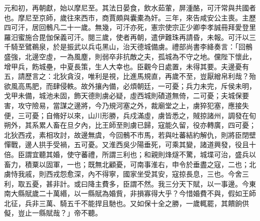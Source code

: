 \begin{pinyinscope}
 元和初，再朝獻，始以摩尼至。其法日晏食，飲水茹葷，屏湩酪，可汗常與共國者也。摩尼至京師，歲往來西市，商賈頗與囊橐為奸。三年，來告咸安公主喪。主歷四可汗，居回鶻凡二十一歲。無幾，可汗亦死，憲宗使宗正少卿李孝誠冊拜愛登里羅汨蜜施合毘伽保義可汗。閱三歲，使者再朝，遣伊難珠再請昏，未報。可汗以三千騎至鷿鵜泉，於是振武以兵屯黑山，治天德城備虜。禮部尚書李絳奏言：「回鶻盛強，北邊空虛，一為風塵，則弱卒非抗敵之夫，孤城為不守之地。儻陛下懷此，增甲兵，飭城壘，中夏長策，生人大幸也。臣觀今日處置，未得其要。夫邊憂有五，請歷言之：北狄貪沒，唯利是視，比進馬規直，再歲不至，豈厭繒帛利哉？殆欲風高馬肥，而肆侵軼。故外攘內備，必煩朝廷，一可憂；兵力未完，斥侯未明，戈甲未備，城池未固，飾天德則虜必疑，虛西城則磧道無倚，二可憂；夫城保要害，攻守險易，當謀之邊將，今乃規河塞之外，裁廟堂之上，虜猝犯塞，應接失便，三可憂；自脩好以來，山川形勝，兵戍滿虛，虜皆悉之，賊掠諸州，調發在旬朔外，其系累人畜在旦夕內，比王師至則虜已歸，寇能久留，役亦轉廣，四可憂；北狄西戎，素相攻討，故邊無虞，今回鶻不市馬，若與吐蕃結約解仇，則將臣閉壁憚戰，邊人拱手受禍，五可憂。又淮西吳少陽垂死，可乘其變，諸道興發，役且十倍。臣謂宜聽其婚，使守蕃禮，所謂三利也；和親則烽燧不驚，城堞可治，盛兵以畜力，積粟以固軍，一也；既無北顧憂，可南事淮右，申令於垂盡之寇，二也；北虜恃我戚，則西戎怨愈深，內不得寧，國家坐受其安，寇掠長息，三也。今舍三利，取五憂，甚非計。或曰降主費多，臣謂不然。我三分天下賦，以一事邊。今東南大縣賦歲二十萬緡，以一縣賦為婚貲，非損寡得大乎？今惜婚費不與，假如王師北征，兵非三萬、騎五千不能捍且馳也。又如保十全之勝，一歲輒罷，其饋餉供儗，豈止一縣賦哉？」帝不聽。



\end{pinyinscope}